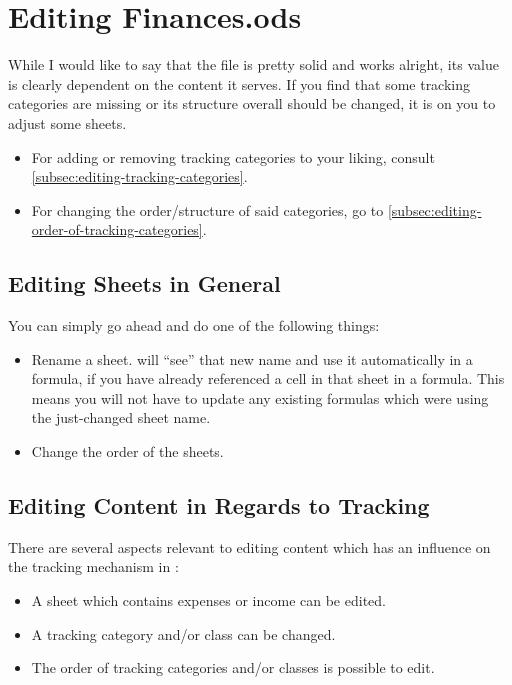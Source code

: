 \section{Editing Finances.ods}
\label{sec:editing-finances.ods}

While I would like to say that the file is pretty solid and works alright, its value is clearly dependent on the content it serves.
If you find that some tracking categories are missing or its structure overall should be changed, it is on you to adjust some sheets.
\begin{itemize}
	\item For adding or removing tracking categories to your liking, consult \autoref{subsec:editing-tracking-categories}.
	\item For changing the order/structure of said categories, go to \autoref{subsec:editing-order-of-tracking-categories}.
\end{itemize}

\subsection{Editing Sheets in General}
\label{subsec:editing-general-sheet-editing}

You can simply go ahead and do one of the following things:
\begin{itemize}
	\item Rename a sheet.
	\loc will ``see'' that new name and use it automatically in a formula, if you have already referenced a cell in that sheet in a formula.
	This means you will not have to update any existing formulas which were using the just-changed sheet name.
	\item Change the order of the sheets.
\end{itemize}

\subsection{Editing Content in Regards to Tracking}
\label{subsec:editing-content-in-regards-to-tracking}

There are several aspects relevant to editing content which has an influence on the tracking mechanism in \tfn:
\begin{itemize}
	\item A sheet which contains expenses or income can be edited.
	\item A tracking category and/or class can be changed.
	\item The order of tracking categories and/or classes is possible to edit.
\end{itemize}

